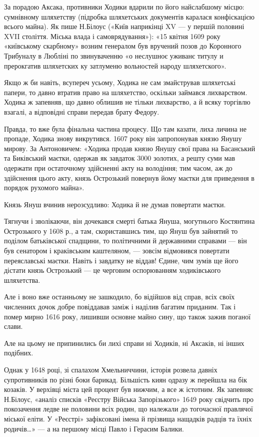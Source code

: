 За порадою Аксака, противники Ходики вдарили по його найслабшому місцю:
сумнівному шляхетству (підробка шляхетських документів каралася конфіскацією
всього майна). Як пише Н.Білоус («Київ наприкінці XV — у першій половині XVII
століття. Міська влада і самоврядування»): «15 квітня 1609 року «київському
скарбному» возним генералом був вручений позов до Коронного Трибуналу в Любліні
по звинуваченню «о неслушноє уживанє титулу и прерокгатив шляхетских ку
затлуменю вольностей народу шляхетского». 

Якщо ж би навіть, всупереч усьому, Ходика не сам змайстрував шляхетські папери,
то давно втратив право на шляхетство, оскільки займався лихварством. Ходика ж
запевняв, що давно облишив не тільки лихварство, а й всяку торгівлю взагалі, а
відповідні справи передав брату Федору.

Правда, то вже була фінальна частина процесу. Що там казати, лиха личина не
пропаде, Ходика знову викрутився. 1607 року він запропонував князю Янушу
мирову. За Антоновичем: «Ходика продав князю Янушу свої права на Басанський та
Биківський маєтки, одержав як завдаток 3000 золотих, а решту суми мав одержати
при остаточному здійсненні акту на володіння; тим часом, аж до здійснення цього
акту, князь Острозький повернув йому маєтки для приведення в порядок рухомого
майна».

Князь Януш вчинив нерозсудливо: Ходика й не думав повертати маєтки. 

Тягнучи і зволікаючи, він дочекався смерті батька Януша, могутнього Костянтина
Острозького у 1608 р., а там, скориставшись тим, що Януш був зайнятий то
поділом батьківської спадщини, то політичними й державними справами — він був
сенатором і краківським каштеляном, — зовсім відмовився повертати переяславські
маєтки. Навіть і завдатку не віддав! Єдине, чим зумів ще його дістати князь
Острозький — це черговим оспорюванням ходиківського шляхетства. 

Але і воно вже останньому не зашкодило, бо відійшов від справ, всіх своїх
численних дочок добре повіддавав заміж і наділив багатим приданим. Так і помер
мирно 1616 року, лишивши основне майно сину, що також зажив поганої слави. 

Але на цьому не припинились би лихі справи ні Ходиків, ні Аксаків, ні інших
подібних.

Однак у 1648 році, зі спалахом Хмельниччини, історія розвела давніх
супротивників по різні боки барикад. Більшість киян одразу ж перейшла на бік
козаків. У верхівці міста цей процент був нижчим, а все ж істотним. Як запевняє
Н.Білоус, «аналіз списків «Реєстру Війська Запорізького» 1649 року свідчить про
покозачення ледве не половини всіх родин, що належали до тогочасної правлячої
міської еліти. У «Реєстрі» зафіксовані імена й прізвища нащадків радців та
їхніх родичів…» — а на першому місці Павло і Герасим Балики.

